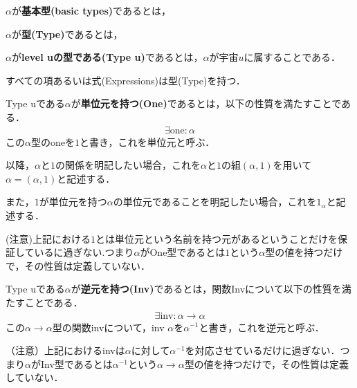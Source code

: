 \begin{definition}
    $\alpha$が\textbf{基本型(basic types)}であるとは，
\end{definition}

\begin{definition}
    $\alpha$が\textbf{型(Type)}であるとは，
\end{definition}
\fi

\begin{definition}
    $\alpha$が\textbf{level uの型である(Type u)}であるとは，$\alpha$が宇宙$u$に属することである．

    すべての項あるいは式(Expressions)は型(Type)を持つ．

\end{definition}


\begin{definition}
    Type uである$\alpha$が\textbf{単位元を持つ(One)}であるとは，以下の性質を満たすことである．
    \begin{align}
        \exists\text{one} : \alpha
    \end{align}
    この$\alpha$型のoneを$1$と書き，これを単位元と呼ぶ．

    以降，$\alpha$と$1$の関係を明記したい場合，これを$\alpha$と$1$の組$(\alpha,1)$を用いて$\alpha = (\alpha,1)$と記述する．

    また，$1$が単位元を持つ$\alpha$の単位元であることを明記したい場合，これを$1_\alpha$と記述する．

    (注意)上記における$1$とは単位元という名前を持つ元があるということだけを保証しているに過ぎない.つまり$\alpha$がOne型であるとは$1$という$\alpha$型の値を持つだけで，その性質は定義していない．
\end{definition}

\begin{definition}
    Type uである$\alpha$が\textbf{逆元を持つ(Inv)}であるとは，関数Invについて以下の性質を満たすことである．
    \begin{align}
        \exists\text{inv} : \alpha \rightarrow \alpha
    \end{align}
    この$\alpha \rightarrow \alpha$型の関数invについて，inv $\alpha$を$\alpha^{-1}$と書き，これを逆元と呼ぶ．

    （注意）上記におけるinvは$\alpha$に対して$\alpha^{-1}$を対応させているだけに過ぎない．つまり$\alpha$がInv型であるとは$\alpha^{-1}$という$\alpha\rightarrow\alpha$型の値を持つだけで，その性質は定義していない．
\end{definition}

